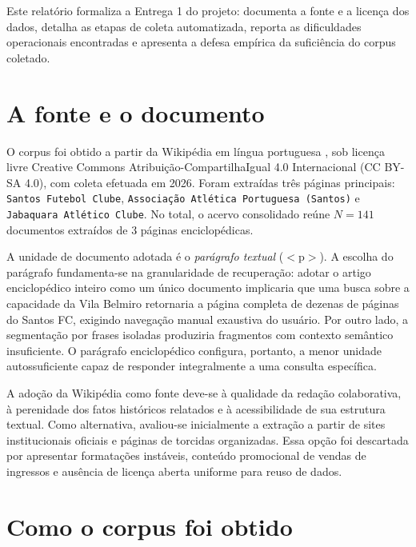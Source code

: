 \documentclass[
  article,
  12pt,
  oneside,
  a4paper,
  english,
  brazil
]{abntex2}\usepackage[]{graphicx}\usepackage[]{xcolor}
\begin{document}
Este relatório formaliza a Entrega 1 do projeto: documenta a fonte e a licença dos dados, detalha as etapas de coleta automatizada, reporta as dificuldades operacionais encontradas e apresenta a defesa empírica da suficiência do corpus coletado.

\section{A fonte e o documento}

O corpus foi obtido a partir da Wikipédia em língua portuguesa \cite{wikipedia}, sob licença livre Creative Commons Atribuição-CompartilhaIgual 4.0 Internacional (CC BY-SA 4.0), com coleta efetuada em 2026. Foram extraídas três páginas principais: \texttt{Santos Futebol Clube}, \texttt{Associação Atlética Portuguesa (Santos)} e \texttt{Jabaquara Atlético Clube}. No total, o acervo consolidado reúne $N = \text{141}$ documentos extraídos de $\text{3}$ páginas enciclopédicas.

A unidade de documento adotada é o \emph{parágrafo textual} ($<\!\text{p}\!>$). A escolha do parágrafo fundamenta-se na granularidade de recuperação: adotar o artigo enciclopédico inteiro como um único documento implicaria que uma busca sobre a capacidade da Vila Belmiro retornaria a página completa de dezenas de páginas do Santos FC, exigindo navegação manual exaustiva do usuário. Por outro lado, a segmentação por frases isoladas produziria fragmentos com contexto semântico insuficiente. O parágrafo enciclopédico configura, portanto, a menor unidade autossuficiente capaz de responder integralmente a uma consulta específica.

A adoção da Wikipédia como fonte deve-se à qualidade da redação colaborativa, à perenidade dos fatos históricos relatados e à acessibilidade de sua estrutura textual. Como alternativa, avaliou-se inicialmente a extração a partir de sites institucionais oficiais e páginas de torcidas organizadas. Essa opção foi descartada por apresentar formatações instáveis, conteúdo promocional de vendas de ingressos e ausência de licença aberta uniforme para reuso de dados.

\section{Como o corpus foi obtido}
\end{document}
